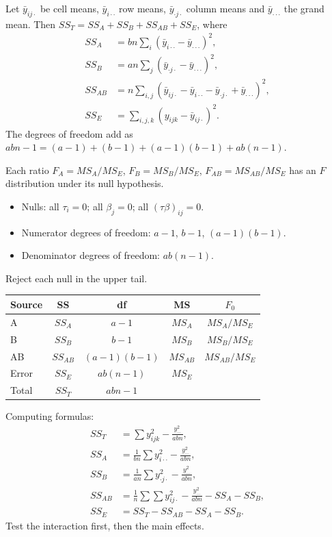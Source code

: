 \begin{theorem}\label{thm:twofactor}
Let $\bar{y}_{ij\cdot}$ be cell means, $\bar{y}_{i\cdot\cdot}$ row means, $\bar{y}_{\cdot j\cdot}$ column means and $\bar{y}_{\cdot\cdot\cdot}$ the grand mean. Then $SS_T=SS_A+SS_B+SS_{AB}+SS_E$, where
\begin{align*}
SS_A&=bn\sum_i(\bar{y}_{i\cdot\cdot}-\bar{y}_{\cdot\cdot\cdot})^2,\\
SS_B&=an\sum_j(\bar{y}_{\cdot j\cdot}-\bar{y}_{\cdot\cdot\cdot})^2,\\
SS_{AB}&=n\sum_{i,j}(\bar{y}_{ij\cdot}-\bar{y}_{i\cdot\cdot}-\bar{y}_{\cdot j\cdot}+\bar{y}_{\cdot\cdot\cdot})^2,\\
SS_E&=\sum_{i,j,k}(y_{ijk}-\bar{y}_{ij\cdot})^2.
\end{align*}
The degrees of freedom add as $abn-1=(a-1)+(b-1)+(a-1)(b-1)+ab(n-1)$.
\end{theorem}

\begin{theorem}\label{thm:twofactor-F}
Each ratio $F_A=MS_A/MS_E$, $F_B=MS_B/MS_E$, $F_{AB}=MS_{AB}/MS_E$ has an $F$ distribution under its null hypothesis.
\begin{itemize}
  \item Nulls: all $\tau_i=0$; all $\beta_j=0$; all $(\tau\beta)_{ij}=0$.
  \item Numerator degrees of freedom: $a-1$, $b-1$, $(a-1)(b-1)$.
  \item Denominator degrees of freedom: $ab(n-1)$.
\end{itemize}
Reject each null in the upper tail.
\end{theorem}

\begin{center}
\begin{tabular}{lcccc}
\toprule
Source & SS & df & MS & $F_0$\\
\midrule
A & $SS_A$ & $a-1$ & $MS_A$ & $MS_A/MS_E$\\
B & $SS_B$ & $b-1$ & $MS_B$ & $MS_B/MS_E$\\
AB & $SS_{AB}$ & $(a-1)(b-1)$ & $MS_{AB}$ & $MS_{AB}/MS_E$\\
Error & $SS_E$ & $ab(n-1)$ & $MS_E$ & \\
Total & $SS_T$ & $abn-1$ & & \\
\bottomrule
\end{tabular}
\end{center}

Computing formulas:
\begin{align*}
SS_T&=\sum y_{ijk}^2-\frac{y_{\cdots}^2}{abn},\\
SS_A&=\frac1{bn}\sum y_{i\cdot\cdot}^2-\frac{y_{\cdots}^2}{abn},\\
SS_B&=\frac1{an}\sum y_{\cdot j\cdot}^2-\frac{y_{\cdots}^2}{abn},\\
SS_{AB}&=\frac1n\sum\sum y_{ij\cdot}^2-\frac{y_{\cdots}^2}{abn}-SS_A-SS_B,\\
SS_E&=SS_T-SS_{AB}-SS_A-SS_B.
\end{align*}
Test the interaction first, then the main effects.

